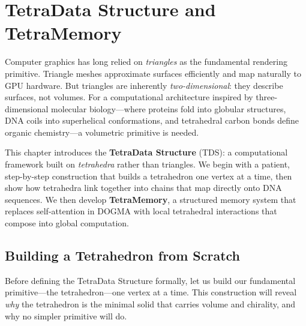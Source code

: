 
\chapter{TetraData Structure and TetraMemory}
\label{ch:tetradata}


\noindent
Computer graphics has long relied on \emph{triangles} as the fundamental rendering primitive.
Triangle meshes approximate surfaces efficiently and map naturally to GPU hardware.
But triangles are inherently \emph{two-dimensional}: they describe surfaces, not volumes.
For a computational architecture inspired by three-dimensional molecular biology---where
proteins fold into globular structures, DNA coils into superhelical conformations, and
tetrahedral carbon bonds define organic chemistry---a volumetric primitive is needed.

This chapter introduces the \textbf{TetraData Structure} (TDS): a computational framework
built on \emph{tetrahedra} rather than triangles. We begin with a patient, step-by-step
construction that builds a tetrahedron one vertex at a time, then show how tetrahedra
link together into chains that map directly onto DNA sequences. We then develop
\textbf{TetraMemory}, a structured memory system that replaces self-attention in DOGMA
with local tetrahedral interactions that compose into global computation.

\section{Building a Tetrahedron from Scratch}
\label{sec:building-tetra}

Before defining the TetraData Structure formally, let us build our fundamental
primitive---the tetrahedron---one vertex at a time. This construction will reveal
\emph{why} the tetrahedron is the minimal solid that carries volume and chirality,
and why no simpler primitive will do.

